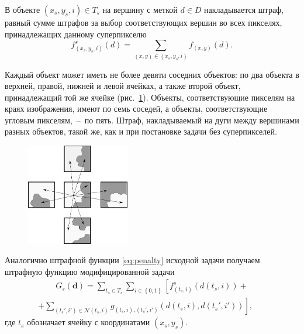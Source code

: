 \documentclass{ConfFTI}
\begin{document}
В объекте $\left( x_s, y_s, i \right) \in T_s$ на вершину с меткой $d \in D$
накладывается штраф,
равный сумме штрафов за выбор соответствующих вершин во всех пикселях,
принадлежащих данному суперпикселю
\begin{equation*}
    f_{\left(x_s, y_s, i \right)}^s \left(d \right) =
    \sum \limits_{\left(x, y \right) \in \left(x_s, y_s, i \right)}
        f_{\left(x, y \right)} \left(d \right).
\end{equation*}

Каждый объект может иметь не более девяти соседних объектов:
по два объекта в верхней,
правой, нижней и левой ячейках, а также второй объект,
принадлежащий той же ячейке (рис.~\ref{fig:neighbors:superpixel}).
Объекты, соответствующие пикселям на краях изображения,
имеют по семь соседей, а объекты,
соответствующие угловым пикселям,~--~по пять.
Штраф, накладываемый на дуги между вершинами разных объектов, такой же,
как и при постановке задачи без суперпикселей.

\begin{figure}[h]
  \centering
  \includegraphics[width=0.4\textwidth]{images/neighbours_superpixel}
  \label{fig:neighbors:superpixel}
\end{figure}

Аналогично штрафной функции \eqref{eq:penalty} исходной задачи
получаем штрафную функцию модифицированной задачи
\begin{equation*}
\begin{gathered}
    \phantom{\sum \limits_{\mathcal{N}}}
    G_s \left(\pmb{d} \right) =
    \sum \limits_{t_s \in T_s}
        \sum \limits_{i \in \left\{0, 1 \right\}}
            \left[
                f_{\left(t_s, i \right)}^s \left(
                    d \left(t_s, i \right)
                \right) +
                \phantom{\sum \limits_{\mathcal{N}}} \right. \\
                + \left.
                \sum \limits_{\left(t_s', i' \right) \in \mathcal{N}\left(t_s, i \right)}
                g_{\left(t_s, i \right), \left(t_s', i' \right)} \left(
                    d \left(t_s, i \right), d\left(t_s', i' \right)
                \right)
            \right],
\end{gathered}
\end{equation*}
где $t_s$ обозначает ячейку с координатами $\left( x_s, y_s \right)$.
\end{document}
